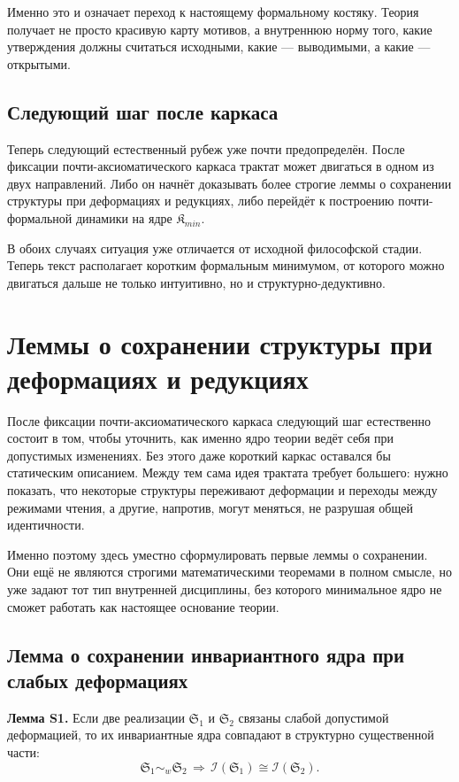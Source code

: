 \documentclass[12pt,a4paper]{article}
\begin{document}
Именно это и означает переход к настоящему формальному костяку. Теория получает не просто красивую карту мотивов, а внутреннюю норму того, какие утверждения должны считаться исходными, какие --- выводимыми, а какие --- открытыми.

\subsection{Следующий шаг после каркаса}

Теперь следующий естественный рубеж уже почти предопределён. После фиксации почти-аксиоматического каркаса трактат может двигаться в одном из двух направлений. Либо он начнёт доказывать более строгие леммы о сохранении структуры при деформациях и редукциях, либо перейдёт к построению почти-формальной динамики на ядре \(\mathfrak{K}_{min}\).

В обоих случаях ситуация уже отличается от исходной философской стадии. Теперь текст располагает коротким формальным минимумом, от которого можно двигаться дальше не только интуитивно, но и структурно-дедуктивно.

\section{Леммы о сохранении структуры при деформациях и редукциях}

После фиксации почти-аксиоматического каркаса следующий шаг естественно состоит в том, чтобы уточнить, как именно ядро теории ведёт себя при допустимых изменениях. Без этого даже короткий каркас оставался бы статическим описанием. Между тем сама идея трактата требует большего: нужно показать, что некоторые структуры переживают деформации и переходы между режимами чтения, а другие, напротив, могут меняться, не разрушая общей идентичности.

Именно поэтому здесь уместно сформулировать первые леммы о сохранении. Они ещё не являются строгими математическими теоремами в полном смысле, но уже задают тот тип внутренней дисциплины, без которого минимальное ядро не сможет работать как настоящее основание теории.

\subsection{Лемма о сохранении инвариантного ядра при слабых деформациях}

\textbf{Лемма S1.} Если две реализации \(\mathfrak{S}_1\) и \(\mathfrak{S}_2\) связаны слабой допустимой деформацией, то их инвариантные ядра совпадают в структурно существенной части:
\begin{equation}
\mathfrak{S}_1 \sim_w \mathfrak{S}_2 \,\Longrightarrow\, \mathcal{I}(\mathfrak{S}_1)\cong \mathcal{I}(\mathfrak{S}_2).
\end{equation}
\end{document}
